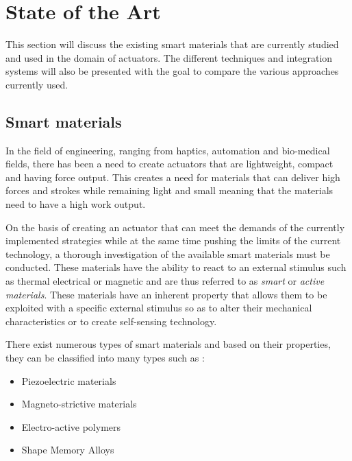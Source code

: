 \section{State of the Art}\label{sec:sota}
This section will discuss the existing smart materials that are currently studied and used in the domain of actuators. The different techniques and integration systems will also be presented with the goal to compare the various approaches currently used.

\subsection{Smart materials}
In the field of engineering, ranging from haptics, automation and bio-medical fields, there has been a need  to create actuators that are lightweight, compact and having force output. This creates a need for materials that can deliver high forces and strokes while remaining light and small meaning that the materials need to have a high work output.

On the basis of creating an actuator that can meet the demands of the currently implemented strategies while at the same time pushing the limits of the current technology, a thorough investigation of the available smart materials must be conducted. These materials have the ability to react to an external stimulus such as thermal electrical or magnetic and are thus referred to as \emph{smart} or \emph{active materials}. These materials have an inherent property that allows them to be exploited with a specific external stimulus so as to alter their mechanical characteristics or to create self-sensing technology.

There exist numerous types of smart materials and based on their properties, they can be classified into many types such as :
\begin{itemize}
  \item Piezoelectric materials
  \item Magneto-strictive materials
  \item Electro-active polymers
  \item Shape Memory Alloys
\end{itemize}
